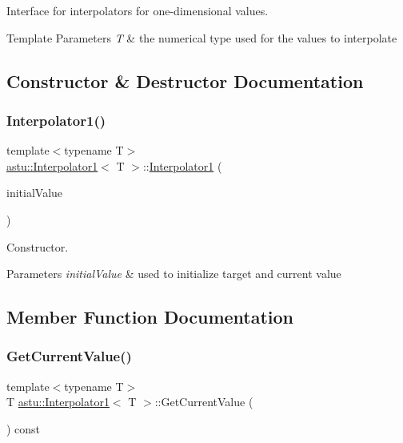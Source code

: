 Interface for interpolators for one-\/dimensional values.


\begin{DoxyTemplParams}{Template Parameters}
{\em T} & the numerical type used for the values to interpolate \\
\hline
\end{DoxyTemplParams}


\subsection{Constructor \& Destructor Documentation}
\mbox{\label{classastu_1_1Interpolator1_af077a8b4048006a60119677e08a0434f}} 
\subsubsection{\texorpdfstring{Interpolator1()}{Interpolator1()}}
{\footnotesize\ttfamily template$<$typename T$>$ \\
\hyperlink{classastu_1_1Interpolator1}{astu\+::\+Interpolator1}$<$ T $>$\+::\hyperlink{classastu_1_1Interpolator1}{Interpolator1} (\begin{DoxyParamCaption}\item[{T}]{initial\+Value }\end{DoxyParamCaption})\hspace{0.3cm}{\ttfamily [inline]}}

Constructor.


\begin{DoxyParams}{Parameters}
{\em initial\+Value} & used to initialize target and current value \\
\hline
\end{DoxyParams}


\subsection{Member Function Documentation}
\mbox{\label{classastu_1_1Interpolator1_a82c6c0471a52339263d9584fe19fe112}} 
\subsubsection{\texorpdfstring{Get\+Current\+Value()}{GetCurrentValue()}}
{\footnotesize\ttfamily template$<$typename T$>$ \\
T \hyperlink{classastu_1_1Interpolator1}{astu\+::\+Interpolator1}$<$ T $>$\+::Get\+Current\+Value (\begin{DoxyParamCaption}{ }\end{DoxyParamCaption}) const\hspace{0.3cm}{\ttfamily [inline]}}

